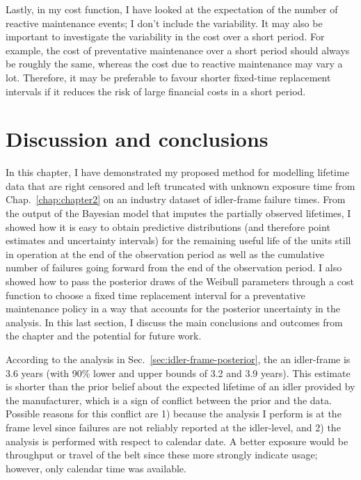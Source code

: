 Lastly, in my cost function, I have looked at the expectation of the number of reactive maintenance events; I don't include the variability. It may also be important to investigate the variability in the cost over a short period. For example, the cost of preventative maintenance over a short period should always be roughly the same, whereas the cost due to reactive maintenance may vary a lot. Therefore, it may be preferable to favour shorter fixed-time replacement intervals if it reduces the risk of large financial costs in a short period.

\section{Discussion and conclusions} \label{sec:idler-frame-conclusions}

In this chapter, I have demonstrated my proposed method for modelling lifetime data that are right censored and left truncated with unknown exposure time from Chap.~\ref{chap:chapter2} on an industry dataset of idler-frame failure times. From the output of the Bayesian model that imputes the partially observed lifetimes, I showed how it is easy to obtain predictive distributions (and therefore point estimates and uncertainty intervals) for the remaining useful life of the units still in operation at the end of the observation period as well as the cumulative number of failures going forward from the end of the observation period. I also showed how to pass the posterior draws of the Weibull parameters through a cost function to choose a fixed time replacement interval for a preventative maintenance policy in a way that accounts for the posterior uncertainty in the analysis. In this last section, I discuss the main conclusions and outcomes from the chapter and the potential for future work. 

According to the analysis in Sec.~\ref{sec:idler-frame-posterior}, the an idler-frame is $3.6$ years (with 90\% lower and upper bounds of 3.2 and 3.9 years). This estimate is shorter than the prior belief about the expected lifetime of an idler provided by the manufacturer, which is a sign of conflict between the prior and the data. Possible reasons for this conflict are 1) because the analysis I perform is at the frame level since failures are not reliably reported at the idler-level, and 2) the analysis is performed with respect to calendar date. A better exposure would be throughput or travel of the belt since these more strongly indicate usage; however, only calendar time was available.

